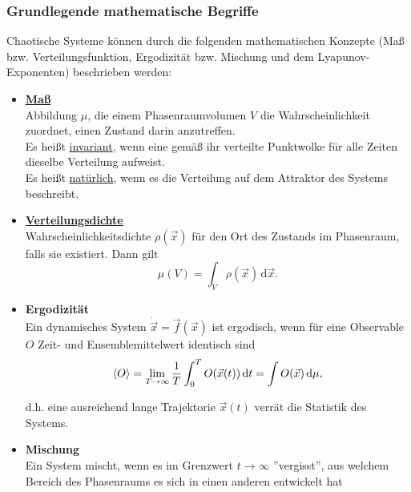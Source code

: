 \documentclass{article}
\newcommand{\diff}{\mathrm{d}}
\begin{document}
\subsubsection{Grundlegende mathematische Begriffe}
Chaotische Systeme können durch die folgenden mathematischen Konzepte (Maß bzw. Verteilungsfunktion, Ergodizität bzw. Mischung und dem Lyapunov-Exponenten) beschrieben werden:
	\begin{itemize}
		\item \underline{\textbf{Maß}}\\
		Abbildung $\mu$, die einem Phasenraumvolumen $V$ die Wahrscheinlichkeit zuordnet, einen Zustand darin anzutreffen.\\
		 Es heißt \underline{invariant}, wenn eine gemäß ihr verteilte Punktwolke für alle Zeiten dieselbe Verteilung aufweist.\\
		 Es heißt \underline{natürlich}, wenn es die Verteilung auf dem Attraktor des Systems beschreibt.
		

		\item \underline{\textbf{Verteilungsdichte}}\\
		Wahrscheinlichkeitsdichte $\rho(\vec{x})$ für den Ort des Zustands im Phasenraum, falls sie existiert. Dann gilt
			\begin{equation}
				\mu(V) = \int_V \rho(\vec{x})\,\mathrm{d}\vec{x}.
			\end{equation}
		
		
		\item \textbf{Ergodizität}\\
		Ein dynamisches System $\dot{\vec{x}} = \vec{f}(\vec{x})$ ist ergodisch, wenn für eine Observable $O$ Zeit- und Ensemblemittelwert identisch sind
			\begin{equation}
				\braket{O} = \lim_{T\to\infty} \frac{1}{T} \int_0^T O(\vec{x}(t)) \, \diff t = \int O(\vec{x}) \, \diff \mu,
			\end{equation}
		
		d.h. eine ausreichend lange Trajektorie $\vec{x}(t)$ verrät die Statistik des Systems.


		\item \textbf{Mischung}\\
		Ein System mischt, wenn es im Grenzwert $t \to \infty$ ''vergisst'', aus welchem Bereich des Phasenraums es sich in einen anderen entwickelt hat
	\end{itemize}


\newpage
\end{document}
